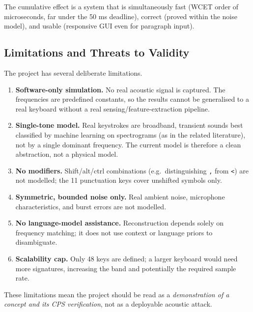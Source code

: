 \documentclass[11pt,a4paper]{article}
\begin{document}
The cumulative effect is a system that is simultaneously fast (WCET order of
microseconds, far under the 50 ms deadline), correct (proved within the noise
model), and usable (responsive GUI even for paragraph input).

\subsection{Limitations and Threats to Validity}
\label{sec:limitations}

The project has several deliberate limitations.

\begin{enumerate}
    \item \textbf{Software-only simulation.} No real acoustic signal is
          captured. The frequencies are predefined constants, so the results
          cannot be generalised to a real keyboard without a real
          sensing/feature-extraction pipeline.
    \item \textbf{Single-tone model.} Real keystrokes are broadband, transient
          sounds best classified by machine learning on spectrograms (as in the
          related literature), not by a single dominant frequency. The current
          model is therefore a clean abstraction, not a physical model.
    \item \textbf{No modifiers.} Shift/alt/ctrl combinations (e.g.\
          distinguishing \texttt{,} from \texttt{<}) are not modelled; the 11
          punctuation keys cover unshifted symbols only.
    \item \textbf{Symmetric, bounded noise only.} Real ambient noise,
          microphone characteristics, and burst errors are not modelled.
    \item \textbf{No language-model assistance.} Reconstruction depends solely
          on frequency matching; it does not use context or language priors to
          disambiguate.
    \item \textbf{Scalability cap.} Only 48 keys are defined; a larger keyboard
          would need more signatures, increasing the band and potentially the
          required sample rate.
\end{enumerate}

These limitations mean the project should be read as a \emph{demonstration of a
concept and its CPS verification}, not as a deployable acoustic attack.

\end{document}
